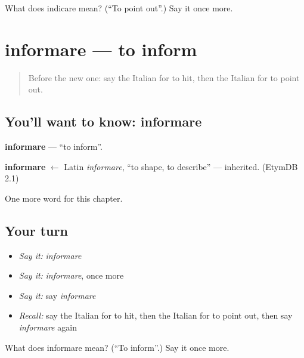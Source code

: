 \begin{tcolorbox}[breakable,colback=teal!4,colframe=teal!35!black,title={Before you move on}]
What does indicare mean? (\textquotedblleft{}To point out\textquotedblright{}.) Say it once more.
\end{tcolorbox}
\section[informare]{informare — to inform}

\label{lesson:IT-C238-informare}



\begin{quote}
Before the new one: say the Italian for to hit, then the Italian for to point out.
\end{quote}

\subsection*{You'll want to know: informare}
\textbf{informare} — \textquotedblleft{}to inform\textquotedblright{}.

\begin{cousinweb}
\textbf{informare} $\leftarrow$ Latin \emph{informare}, \textquotedblleft{}to shape, to describe\textquotedblright{} — inherited. (EtymDB 2.1)
\end{cousinweb}

\begin{grammarlens}[title={What you've built}]
One more word for this chapter.
\end{grammarlens}

\subsection*{Your turn}
\begin{itemize}
\raggedright
  \item \emph{Say it:} \emph{informare}
  \item \emph{Say it:} \emph{informare}, once more
  \item \emph{Say it:} say \emph{informare}
  \item \emph{Recall:} say the Italian for to hit, then the Italian for to point out, then say \emph{informare} again
\end{itemize}

\begin{tcolorbox}[breakable,colback=teal!4,colframe=teal!35!black,title={Before you move on}]
What does informare mean? (\textquotedblleft{}To inform\textquotedblright{}.) Say it once more.
\end{tcolorbox}
